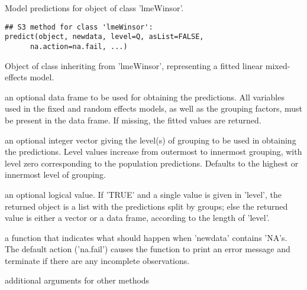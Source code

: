 \begin{Description}\relax
Model predictions for object of class 'lmeWinsor'.
\end{Description}
\begin{Usage}
\begin{verbatim}
## S3 method for class 'lmeWinsor':
predict(object, newdata, level=Q, asList=FALSE,
      na.action=na.fail, ...)
\end{verbatim}
\end{Usage}
\begin{Arguments}
\begin{ldescription}
\item[\code{ object }] Object of class inheriting from 'lmeWinsor', representing a fitted
linear mixed-effects model.  

\item[\code{ newdata }] an optional data frame to be used for obtaining the predictions. All
variables used in the fixed and random effects models, as well as
the grouping factors, must be present in the data frame. If missing,
the fitted values are returned.

\item[\code{ level }] an optional integer vector giving the level(s) of grouping to be
used in obtaining the predictions. Level values increase from
outermost to innermost grouping, with level zero corresponding to
the population predictions. Defaults to the highest or innermost
level of grouping. 

\item[\code{ asList }] an optional logical value. If 'TRUE' and a single value is given in
'level', the returned object is a list with the predictions split by
groups; else the returned value is either a vector or a data frame,
according to the length of 'level'. 

\item[\code{na.action}] a function that indicates what should happen when 'newdata' contains
'NA's.  The default action ('na.fail') causes the function to print
an error message and terminate if there are any incomplete
observations. 

\item[\code{...}] additional arguments for other methods

\end{ldescription}
\end{Arguments}
